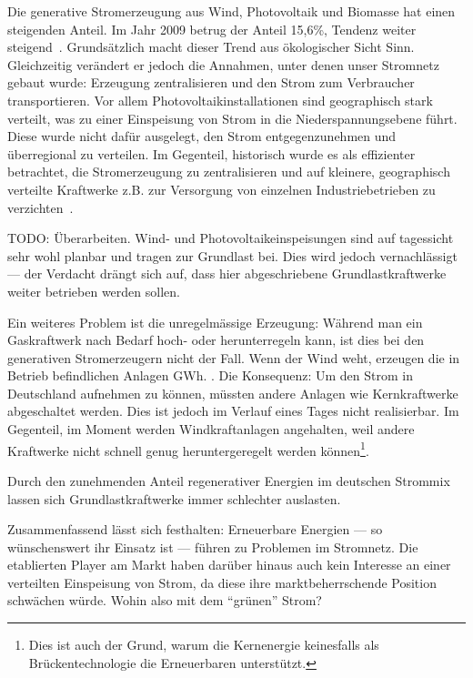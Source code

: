 \documentclass[12pt,BCOR=8.5mm]{scrartcl}
\begin{document}
Die generative Stromerzeugung aus Wind, Photovoltaik und Biomasse hat
einen steigenden Anteil. Im Jahr 2009 betrug der Anteil 15,6\%, Tendenz
weiter steigend~\cite{web:bmwi-energiedaten}. Grundsätzlich macht dieser
Trend aus ökologischer Sicht Sinn. Gleichzeitig verändert er jedoch die
Annahmen, unter denen unser Stromnetz gebaut wurde: Erzeugung
zentralisieren und den Strom zum Verbraucher transportieren. Vor allem
Photovoltaikinstallationen sind geographisch stark verteilt, was zu
einer Einspeisung von Strom in die Niederspannungsebene führt. Diese
wurde nicht dafür ausgelegt, den Strom entgegenzunehmen und überregional
zu verteilen. Im Gegenteil, historisch wurde es als effizienter
betrachtet, die Stromerzeugung zu zentralisieren und auf kleinere,
geographisch verteilte Kraftwerke z.B. zur Versorgung von einzelnen
Industriebetrieben zu verzichten~\cite{carr08switch}.

TODO: Überarbeiten. Wind- und Photovoltaikeinspeisungen sind auf
tagessicht sehr wohl planbar und tragen zur Grundlast bei. Dies wird
jedoch vernachlässigt --- der Verdacht drängt sich auf, dass hier
abgeschriebene Grundlastkraftwerke weiter betrieben werden sollen.

Ein weiteres Problem ist die unregelmässige Erzeugung: Während man ein
Gaskraftwerk nach Bedarf hoch- oder herunterregeln kann, ist dies bei
den generativen Stromerzeugern nicht der Fall. Wenn der Wind weht,
erzeugen die in Betrieb befindlichen Anlagen 
GWh. . Die Konsequenz: Um den
Strom in Deutschland aufnehmen zu können, müssten andere Anlagen wie
Kernkraftwerke abgeschaltet werden. Dies ist jedoch im Verlauf eines
Tages nicht realisierbar. Im Gegenteil, im Moment werden
Windkraftanlagen angehalten, weil andere Kraftwerke nicht schnell genug
heruntergeregelt werden können\footnote{Dies ist auch der Grund, warum die
Kernenergie keinesfalls als Brückentechnologie die Erneuerbaren
unterstützt.}. 

Durch den zunehmenden Anteil regenerativer Energien im deutschen Strommix lassen sich Grundlastkraftwerke immer schlechter auslasten.

Zusammenfassend lässt sich festhalten: Erneuerbare Energien --- so
wünschenswert ihr Einsatz ist --- führen zu Problemen im Stromnetz. Die
etablierten Player am Markt haben darüber hinaus auch kein Interesse an
einer verteilten Einspeisung von Strom, da diese ihre marktbeherrschende
Position schwächen würde. Wohin also mit dem "`grünen"' Strom?
\end{document}
